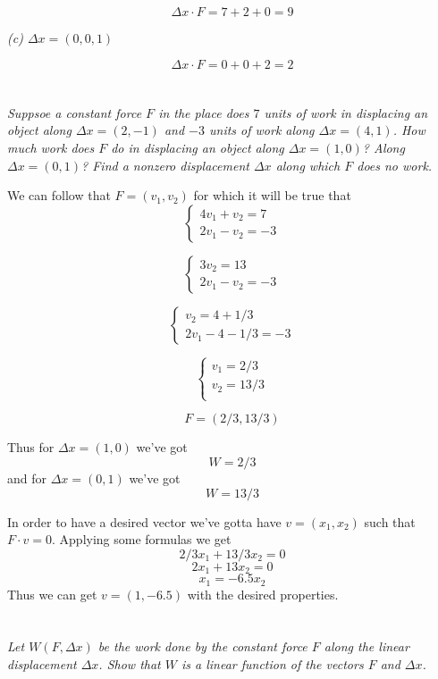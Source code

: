 \documentclass[11pt,oneside,titlepage]{book}
\begin{document}
$$\Delta x \cdot F = 7 + 2 + 0 = 9$$

\textit{(c) $\Delta x = (0, 0, 1)$}

$$\Delta x \cdot F = 0 + 0 + 2  = 2$$

\section{}

\textit{Suppsoe a constant force $F$ in the place does $7$ units of work in displacing an
  object along $\Delta x = (2, -1)$ and $-3$ units of work along $\Delta x = (4, 1)$. How
  much work does $F$ do in displacing an object along $\Delta x = (1, 0)$? Along
  $\Delta x = (0, 1)$? Find a nonzero displacement $\Delta x$ along which $F$ does no work.}

We can follow that $F = (v_1, v_2)$ for which it will be true that
$$
\begin{cases}
  4 v_1 + v_2 = 7 \\
  2 v_1 - v_2 = -3
\end{cases}
$$

$$
\begin{cases}
  3v_2  = 13 \\
  2 v_1 - v_2 = -3
\end{cases}
$$

$$
\begin{cases}
  v_2  = 4 + 1/3 \\
  2 v_1 - 4 - 1/3 = -3
\end{cases}
$$

$$
\begin{cases}
  v_1 = 2/3 \\ 
  v_2  = 13/3 \\
\end{cases}
$$

$$F = (2/3, 13/3)$$

Thus for $\Delta x = (1, 0)$ we've got
$$W  = 2/3$$
and for $\Delta x = (0, 1)$ we've got
$$W  = 13/3$$

In order to have a desired vector we've gotta have $v = (x_1, x_2)$ such that $F \cdot v = 0$.
Applying some formulas we get 
$$2/3 x_1 + 13/3 x_2 = 0$$
$$2 x_1 + 13 x_2 = 0$$
$$x_1 = -6.5 x_2$$
Thus we can get $v = (1, -6.5)$ with the desired properties.

\section{}

\textit{Let $W(F, \Delta x)$ be the work done by the constant force $F$ along the linear
  displacement $\Delta x$. Show that $W$ is a linear function of the vectors $F$ and
  $\Delta x $.}
\end{document}
